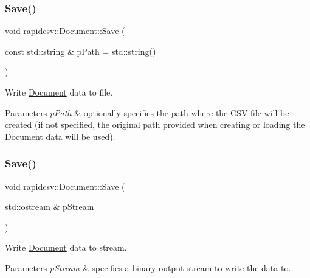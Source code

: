 \subsubsection{\texorpdfstring{Save()}{Save()}\hspace{0.1cm}{\footnotesize\ttfamily [1/2]}}
{\footnotesize\ttfamily void rapidcsv\+::\+Document\+::\+Save (\begin{DoxyParamCaption}\item[{const std\+::string \&}]{p\+Path = {\ttfamily std\+:\+:string()} }\end{DoxyParamCaption})\hspace{0.3cm}{\ttfamily [inline]}}



Write \hyperlink{classrapidcsv_1_1Document}{Document} data to file. 


\begin{DoxyParams}{Parameters}
{\em p\+Path} & optionally specifies the path where the C\+S\+V-\/file will be created (if not specified, the original path provided when creating or loading the \hyperlink{classrapidcsv_1_1Document}{Document} data will be used). \\
\hline
\end{DoxyParams}
\mbox{\label{classrapidcsv_1_1Document_ab0f3254e4cbe582c37395b81f5306e80}} 
\subsubsection{\texorpdfstring{Save()}{Save()}\hspace{0.1cm}{\footnotesize\ttfamily [2/2]}}
{\footnotesize\ttfamily void rapidcsv\+::\+Document\+::\+Save (\begin{DoxyParamCaption}\item[{std\+::ostream \&}]{p\+Stream }\end{DoxyParamCaption})\hspace{0.3cm}{\ttfamily [inline]}}



Write \hyperlink{classrapidcsv_1_1Document}{Document} data to stream. 


\begin{DoxyParams}{Parameters}
{\em p\+Stream} & specifies a binary output stream to write the data to. \\
\hline
\end{DoxyParams}
\mbox{\label{classrapidcsv_1_1Document_a898aaeab0412ad7de186f669194569f8}} 
